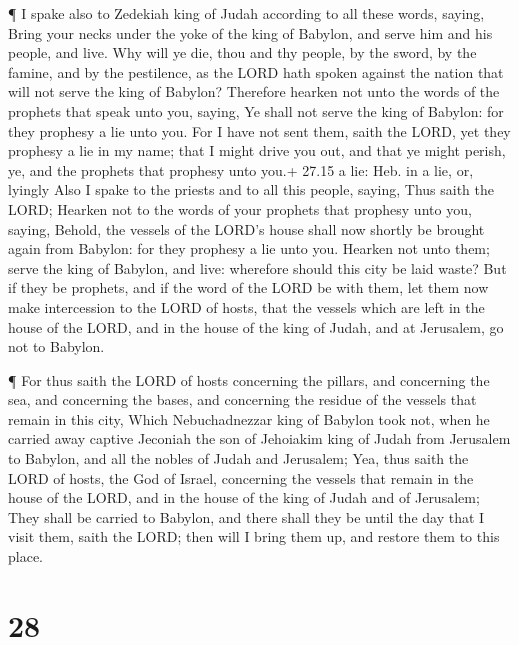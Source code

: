  ¶ I spake also to Zedekiah king of Judah according to all
these words, saying, Bring your necks under the yoke of the king of
Babylon, and serve him and his people, and live.  Why will
ye die, thou and thy people, by the sword, by the famine, and by the
pestilence, as the LORD hath spoken against the nation that will not
serve the king of Babylon?  Therefore hearken not unto the
words of the prophets that speak unto you, saying, Ye shall not serve
the king of Babylon: for they prophesy a lie unto you.  For
I have not sent them, saith the LORD, yet they prophesy a lie in my
name; that I might drive you out, and that ye might perish, ye, and the
prophets that prophesy unto you.+ 27.15 a lie: Heb. in a lie, or,
lyingly  Also I spake to the priests and to all this
people, saying, Thus saith the LORD; Hearken not to the words of your
prophets that prophesy unto you, saying, Behold, the vessels of the
LORD's house shall now shortly be brought again from Babylon: for they
prophesy a lie unto you.  Hearken not unto them; serve the
king of Babylon, and live: wherefore should this city be laid waste?
 But if they be prophets, and if the word of the LORD be
with them, let them now make intercession to the LORD of hosts, that the
vessels which are left in the house of the LORD, and in the house of the
king of Judah, and at Jerusalem, go not to Babylon.

 ¶ For thus saith the LORD of hosts concerning the pillars,
and concerning the sea, and concerning the bases, and concerning the
residue of the vessels that remain in this city,  Which
Nebuchadnezzar king of Babylon took not, when he carried away captive
Jeconiah the son of Jehoiakim king of Judah from Jerusalem to Babylon,
and all the nobles of Judah and Jerusalem;  Yea, thus saith
the LORD of hosts, the God of Israel, concerning the vessels that remain
in the house of the LORD, and in the house of the king of Judah and of
Jerusalem;  They shall be carried to Babylon, and there
shall they be until the day that I visit them, saith the LORD; then will
I bring them up, and restore them to this place.

\hypertarget{section-27}{%
\section{28}\label{section-27}}

